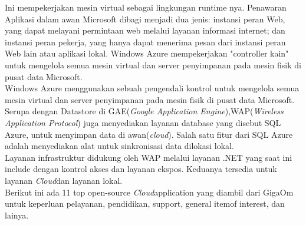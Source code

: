Ini mempekerjakan mesin virtual sebagai lingkungan runtime nya. Penawaran Aplikasi dalam awan Microsoft dibagi menjadi dua jenis: instansi peran Web, yang dapat melayani permintaan web melalui layanan informasi internet; dan instansi peran pekerja, yang hanya dapat menerima pesan dari instansi peran Web lain atau aplikasi lokal. Windows Azure  mempekerjakan "controller kain" untuk mengelola semua mesin virtual dan server penyimpanan pada mesin fisik di pusat data Microsoft.\\
\tab Windows Azure menggunakan sebuah pengendali kontrol untuk  mengelola  semua mesin virtual dan server penyimpanan pada mesin fisik di pusat data Microsoft. Serupa dengan Datastore di GAE(\textit{Google Application Engine}),WAP(\textit{Wireless Application Protocol}) juga menyediakan layanan database yang disebut SQL Azure, untuk menyimpan data di  awan(\textit{cloud}). Salah satu fitur dari SQL Azure adalah menyediakan alat untuk sinkronisasi data dilokasi lokal.\\
Layanan infrastruktur didukung oleh WAP melalui layanan .NET yang saat ini include dengan kontrol akses dan layanan ekspos. Keduanya tersedia untuk layanan \textit{Cloud}dan layanan lokal.\\
Berikut ini ada 11 top open-source \textit{Cloud}application yang diambil dari GigaOm untuk keperluan pelayanan, pendidikan, support, general itemof interest, dan  lainya.\\
